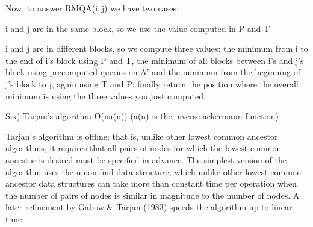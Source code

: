 Now, to answer RMQA(i, j) we have two cases:

i and j are in the same block, so we use the value computed in P and T

i and j are in different blocks, so we compute three values: the minimum from i to the end of i's block using P and T, the minimum of all blocks between i's and j's block using precomputed queries on A' and the minimum from the beginning of j's block to j, again using T and P; finally return the position where the overall minimum is using the three values you just computed.

Six) Tarjan's algorithm O(na(n)) (a(n) is the inverse ackermann function)

Tarjan's algorithm is offline; that is, unlike other lowest common ancestor algorithms, it requires that all pairs of nodes for which the lowest common ancestor is desired must be specified in advance. The simplest version of the algorithm uses the union-find data structure, which unlike other lowest common ancestor data structures can take more than constant time per operation when the number of pairs of nodes is similar in magnitude to the number of nodes. A later refinement by Gabow $\&$ Tarjan (1983) speeds the algorithm up to linear time.

